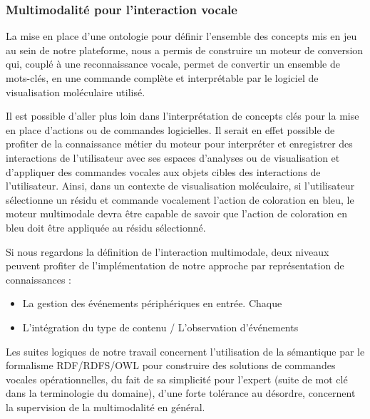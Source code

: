 \subsubsection*{Multimodalité pour l'interaction vocale}

La mise en place d'une ontologie pour définir l'ensemble des concepts mis en jeu au sein de notre plateforme, nous a permis de construire un moteur de conversion qui, couplé à une reconnaissance vocale, permet de convertir un ensemble de mots-clés, en une commande complète et interprétable par le logiciel de visualisation moléculaire utilisé. 

Il est possible d'aller plus loin dans l'interprétation de concepts clés pour la mise en place d'actions ou de commandes logicielles. Il serait en effet possible de profiter de la connaissance métier du moteur pour interpréter et enregistrer des interactions de l'utilisateur avec ses espaces d'analyses ou de visualisation et d'appliquer des commandes vocales aux objets cibles des interactions de l'utilisateur. Ainsi, dans un contexte de visualisation moléculaire, si l'utilisateur sélectionne un résidu et commande vocalement l'action de coloration en bleu, le moteur multimodale devra être capable de savoir que l'action de coloration en bleu doit être appliquée au résidu sélectionné. 

Si nous regardons la définition de l'interaction multimodale, deux niveaux peuvent profiter de l'implémentation de notre approche par représentation de connaissances :

\begin{itemize}
	\item La gestion des événements périphériques en entrée. Chaque 
	\item L'intégration du type de contenu / L'observation d'événements
\end{itemize}

Les suites logiques de notre travail concernent l'utilisation de la sémantique par le formalisme RDF/RDFS/OWL pour construire des solutions de commandes vocales opérationnelles, du fait de sa simplicité pour l'expert (suite de mot clé dans la terminologie du domaine), d'une forte tolérance au désordre, concernent la supervision de la multimodalité en général.
 
